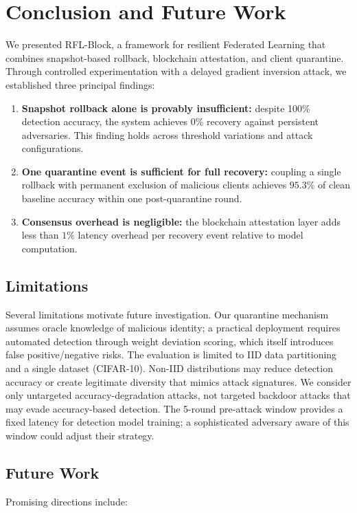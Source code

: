 \documentclass[conference]{IEEEtran}
\begin{document}
\FloatBarrier

\section{Conclusion and Future Work}
\label{sec:conclusion}

We presented RFL-Block, a framework for resilient Federated Learning that combines snapshot-based rollback, blockchain attestation, and client quarantine. Through controlled experimentation with a delayed gradient inversion attack, we established three principal findings:

\begin{enumerate}
    \item \textbf{Snapshot rollback alone is provably insufficient:} despite 100\% detection accuracy, the system achieves 0\% recovery against persistent adversaries. This finding holds across threshold variations and attack configurations.
    \item \textbf{One quarantine event is sufficient for full recovery:} coupling a single rollback with permanent exclusion of malicious clients achieves $95.3\%$ of clean baseline accuracy within one post-quarantine round.
    \item \textbf{Consensus overhead is negligible:} the blockchain attestation layer adds less than $1\%$ latency overhead per recovery event relative to model computation.
\end{enumerate}

\subsection{Limitations}
Several limitations motivate future investigation. Our quarantine mechanism assumes oracle knowledge of malicious identity; a practical deployment requires automated detection through weight deviation scoring, which itself introduces false positive/negative risks. The evaluation is limited to IID data partitioning and a single dataset (CIFAR-10). Non-IID distributions may reduce detection accuracy or create legitimate diversity that mimics attack signatures. We consider only untargeted accuracy-degradation attacks, not targeted backdoor attacks that may evade accuracy-based detection. The 5-round pre-attack window provides a fixed latency for detection model training; a sophisticated adversary aware of this window could adjust their strategy.

\subsection{Future Work}
Promising directions include:
\end{document}
